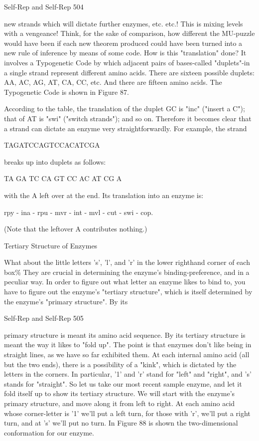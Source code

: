 {Self-Rep and Self-Rep                                                                       504

new strands which will dictate further enzymes, etc. etc.! This is mixing levels with a
vengeance! Think, for the sake of comparison, how different the MU-puzzle would have
been if each new theorem produced could have been turned into a new rule of inference by
means of some code.
  How is this "translation" done? It involves a Typogenetic Code by which adjacent pairs of
bases-called "duplets"-in a single strand represent different amino acids. There are sixteen
possible duplets: AA, AC, AG, AT, CA, CC, etc. And there are fifteen amino acids. The
Typogenetic Code is shown in Figure 87.




According to the table, the translation of the duplet GC is "inc" ("insert a C"); that of AT is
"swi" ("switch strands"); and so on. Therefore it becomes clear that a strand can dictate an
enzyme very straightforwardly. For example, the strand

                               TAGATCCAGTCCACATCGA

breaks up into duplets as follows:

                            TA GA TC CA GT CC AC AT CG A

with the A left over at the end. Its translation into an enzyme is:

      rpy - ina - rpu - mvr - int - mvl - cut - swi - cop.

(Note that the leftover A contributes nothing.)

                                Tertiary Structure of Enzymes

What about the little letters 's', 'l', and 'r' in the lower righthand corner of each box\% They are
crucial in determining the enzyme's binding-preference, and in a peculiar way. In order to
figure out what letter an enzyme likes to bind to, you have to figure out the enzyme's "tertiary
structure", which is itself determined by the enzyme's "primary structure". By its




Self-Rep and Self-Rep                                                                          505

primary structure is meant its amino acid sequence. By its tertiary structure is meant the way
it likes to "fold up". The point is that enzymes don't like being in straight lines, as we have so
far exhibited them. At each internal amino acid (all but the two ends), there is a possibility of
a "kink", which is dictated by the letters in the corners. In particular, '1' and 'r' stand for "left"
and "right", and 's' stands for "straight". So let us take our most recent sample enzyme, and let
it fold itself up to show its tertiary structure. We will start with the enzyme's primary
structure, and move along it from left to right. At each amino acid whose corner-letter is '1'
we'll put a left turn, for those with 'r', we'll put a right turn, and at 's' we'll put no turn. In
Figure 88 is shown the two-dimensional conformation for our enzyme.

}
